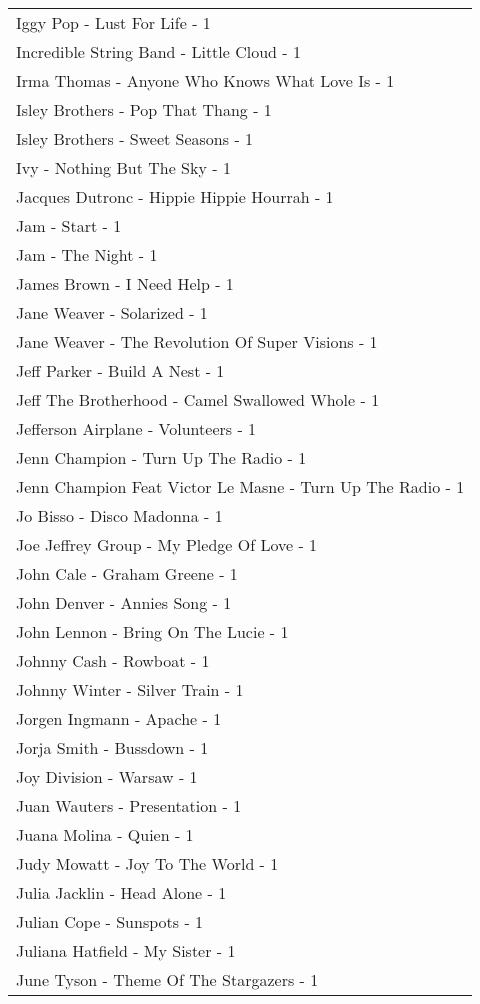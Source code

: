 \documentclass[
]{article}
\begin{document}
\begin{longtable}{l}
Iggy Pop - Lust For Life - 1 \\ 
Incredible String Band - Little Cloud - 1 \\ 
Irma Thomas - Anyone Who Knows What Love Is - 1 \\ 
Isley Brothers - Pop That Thang - 1 \\ 
Isley Brothers - Sweet Seasons - 1 \\ 
Ivy - Nothing But The Sky - 1 \\ 
Jacques Dutronc - Hippie Hippie Hourrah - 1 \\ 
Jam - Start - 1 \\ 
Jam - The Night - 1 \\ 
James Brown - I Need Help - 1 \\ 
Jane Weaver - Solarized - 1 \\ 
Jane Weaver - The Revolution Of Super Visions - 1 \\ 
Jeff Parker - Build A Nest - 1 \\ 
Jeff The Brotherhood - Camel Swallowed Whole - 1 \\ 
Jefferson Airplane - Volunteers - 1 \\ 
Jenn Champion - Turn Up The Radio - 1 \\ 
Jenn Champion Feat Victor Le Masne - Turn Up The Radio - 1 \\ 
Jo Bisso - Disco Madonna - 1 \\ 
Joe Jeffrey Group - My Pledge Of Love - 1 \\ 
John Cale - Graham Greene - 1 \\ 
John Denver - Annies Song - 1 \\ 
John Lennon - Bring On The Lucie - 1 \\ 
Johnny Cash - Rowboat - 1 \\ 
Johnny Winter - Silver Train - 1 \\ 
Jorgen Ingmann - Apache - 1 \\ 
Jorja Smith - Bussdown - 1 \\ 
Joy Division - Warsaw - 1 \\ 
Juan Wauters - Presentation - 1 \\ 
Juana Molina - Quien - 1 \\ 
Judy Mowatt - Joy To The World - 1 \\ 
Julia Jacklin - Head Alone - 1 \\ 
Julian Cope - Sunspots - 1 \\ 
Juliana Hatfield - My Sister - 1 \\ 
June Tyson - Theme Of The Stargazers - 1 \\ 

\end{longtable}
\end{document}
